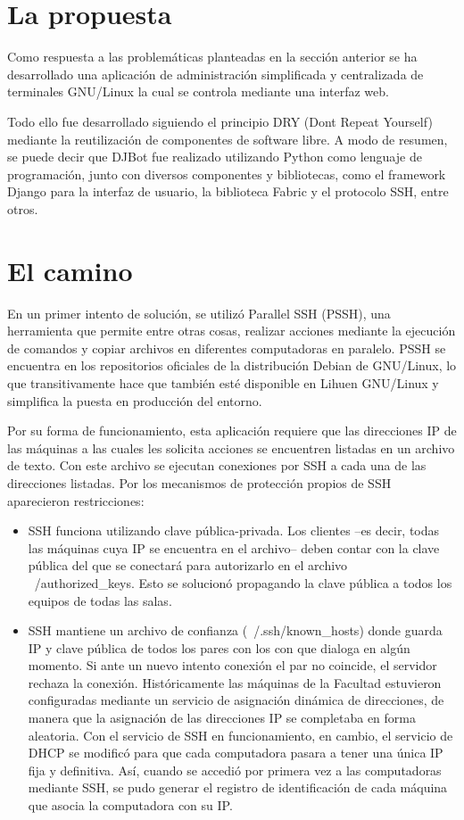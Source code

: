 \documentclass[runningheads,a4paper,titlepage]{llncs}
\begin{document}
\section{La propuesta}

\noindent Como respuesta a las problemáticas planteadas en la sección anterior se ha
desarrollado una aplicación de administración simplificada y centralizada de
terminales GNU/Linux la cual se controla mediante una interfaz web. 

Todo ello fue desarrollado siguiendo el principio DRY (Dont Repeat Yourself)
mediante la reutilización de componentes de software libre. 
A modo de resumen, se puede decir que DJBot fue realizado
utilizando Python como lenguaje de programación, junto con diversos componentes y
bibliotecas, como el framework Django para la interfaz de usuario, la
biblioteca Fabric y el protocolo SSH, entre otros.

\section{El camino}

\noindent En un primer intento de solución, se utilizó Parallel SSH
(PSSH)\cite{parallelssh}, una herramienta que permite entre otras cosas,
realizar acciones mediante la
ejecuci\'on de comandos y copiar archivos en diferentes computadoras en
paralelo. PSSH se encuentra en los repositorios
oficiales de la distribuci\'on Debian de GNU/Linux, lo que transitivamente hace
que tambi\'en est\'e disponible en Lihuen GNU/Linux y simplifica la puesta en
producción del entorno.

Por su forma de funcionamiento, esta aplicación requiere que las direcciones IP
de las máquinas a las cuales les solicita acciones se encuentren listadas en un archivo de texto.
Con este archivo se ejecutan conexiones por SSH a 
cada una de las direcciones listadas.
Por los mecanismos de protección propios de SSH\cite{manssh} aparecieron restricciones:
\begin{itemize}
 \item  SSH funciona utilizando clave p\'ublica-privada. Los clientes --es decir,
todas las máquinas cuya IP se encuentra en el archivo-- deben contar con la
clave p\'ublica del que se conectar\'a para autorizarlo en el archivo ~/authorized\_keys. 
Esto se solucionó propagando la clave pública a todos los equipos de todas las salas.
 \item  SSH mantiene un archivo de confianza (~/.ssh/known\_hosts) donde guarda
IP y clave pública de todos los pares con los con que dialoga en algún momento.
Si ante un nuevo intento conexión el par no coincide, el servidor rechaza la
conexión. Hist\'oricamente las m\'aquinas de la Facultad estuvieron configuradas
mediante un servicio de asignación dinámica de direcciones, de manera que la
asignaci\'on de las direcciones IP se completaba en forma aleatoria. Con
el servicio de SSH en funcionamiento, en cambio, el servicio de DHCP se
modific\'o para que cada computadora pasara a tener una \'unica IP fija y
definitiva. As\'i, cuando se accedi\'o por primera vez a las computadoras
mediante SSH, se pudo generar el registro de identificaci\'on de cada m\'aquina
que asocia la computadora con su IP. 
\end{itemize}
\end{document}
